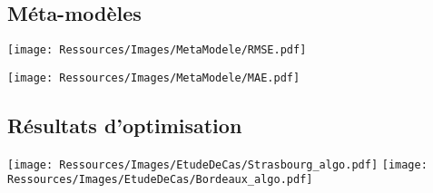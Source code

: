 \documentclass[xcolor=x11names, compress, 11pt]{beamer}
\begin{document}
\subsection{Méta-modèles}
\begin{frame}[noframenumbering, c]
    \vfill
    \centering
    \texttt{[image: Ressources/Images/MetaModele/RMSE.pdf]}
    \vfill
\end{frame}

\begin{frame}[noframenumbering, c]
    \vfill
    \centering
    \texttt{[image: Ressources/Images/MetaModele/MAE.pdf]}
    \vfill
\end{frame}






\subsection{Résultats d’optimisation}
\begin{frame}[noframenumbering, c]
    \vfill
    \centering
    \texttt{[image: Ressources/Images/EtudeDeCas/Strasbourg\_algo.pdf]}
    \texttt{[image: Ressources/Images/EtudeDeCas/Bordeaux\_algo.pdf]}
    \vfill
\end{frame}
\end{document}
